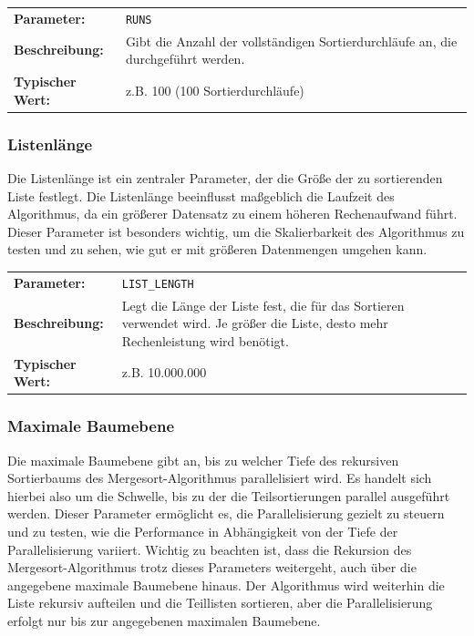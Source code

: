 \documentclass[fontsize=12pt,paper=a4,twoside=semi,parskip=half-,headsepline,headinclude]{scrreprt}
\begin{document}
\begin{tabularx}{\textwidth}{@{}lX@{}}
	\textbf{Parameter:}    & \texttt{RUNS} \\
	\textbf{Beschreibung:} & Gibt die Anzahl der vollständigen Sortierdurchläufe an, die durchgeführt werden. \\
	\textbf{Typischer Wert:} & z.B. 100 (100 Sortierdurchläufe)
\end{tabularx}

\subsubsection{Listenlänge}

Die Listenlänge ist ein zentraler Parameter, der die Größe der zu sortierenden Liste festlegt. Die Listenlänge beeinflusst maßgeblich die Laufzeit des Algorithmus, da ein größerer Datensatz zu einem höheren Rechenaufwand führt. Dieser Parameter ist besonders wichtig, um die Skalierbarkeit des Algorithmus zu testen und zu sehen, wie gut er mit größeren Datenmengen umgehen kann.

\begin{tabularx}{\textwidth}{@{}lX@{}}
	\textbf{Parameter:}    & \texttt{LIST\_LENGTH} \\
	\textbf{Beschreibung:} & Legt die Länge der Liste fest, die für das Sortieren verwendet wird. Je größer die Liste, desto mehr Rechenleistung wird benötigt. \\
	\textbf{Typischer Wert:} & z.B. 10.000.000
\end{tabularx}

\subsubsection{Maximale Baumebene}

Die maximale Baumebene gibt an, bis zu welcher Tiefe des rekursiven Sortierbaums des Mergesort-Algorithmus parallelisiert wird. Es handelt sich hierbei also um die Schwelle, bis zu der die Teilsortierungen parallel ausgeführt werden. Dieser Parameter ermöglicht es, die Parallelisierung gezielt zu steuern und zu testen, wie die Performance in Abhängigkeit von der Tiefe der Parallelisierung variiert. Wichtig zu beachten ist, dass die Rekursion des Mergesort-Algorithmus trotz dieses Parameters weitergeht, auch über die angegebene maximale Baumebene hinaus. Der Algorithmus wird weiterhin die Liste rekursiv aufteilen und die Teillisten sortieren, aber die Parallelisierung erfolgt nur bis zur angegebenen maximalen Baumebene.
\end{document}
